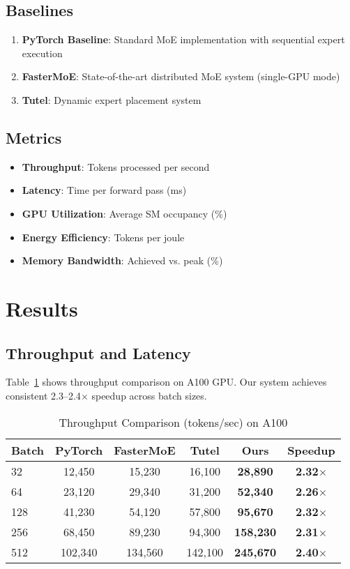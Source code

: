 \documentclass{article}
\begin{document}
\subsection{Baselines}

\begin{enumerate}
    \item \textbf{PyTorch Baseline}: Standard MoE implementation with sequential expert execution
    \item \textbf{FasterMoE}: State-of-the-art distributed MoE system (single-GPU mode)
    \item \textbf{Tutel}: Dynamic expert placement system
\end{enumerate}

\subsection{Metrics}

\begin{itemize}
    \item \textbf{Throughput}: Tokens processed per second
    \item \textbf{Latency}: Time per forward pass (ms)
    \item \textbf{GPU Utilization}: Average SM occupancy (\%)
    \item \textbf{Energy Efficiency}: Tokens per joule
    \item \textbf{Memory Bandwidth}: Achieved vs. peak (\%)
\end{itemize}

\section{Results}

\subsection{Throughput and Latency}

Table~\ref{tab:throughput} shows throughput comparison on A100 GPU. Our system achieves consistent 2.3--2.4$\times$ speedup across batch sizes.

\begin{table}[h]
\centering
\caption{Throughput Comparison (tokens/sec) on A100}
\label{tab:throughput}
\begin{tabular}{lccccc}
\toprule
Batch & PyTorch & FasterMoE & Tutel & \textbf{Ours} & \textbf{Speedup} \\
\midrule
32    & 12,450  & 15,230    & 16,100 & \textbf{28,890}  & \textbf{2.32$\times$} \\
64    & 23,120  & 29,340    & 31,200 & \textbf{52,340}  & \textbf{2.26$\times$} \\
128   & 41,230  & 54,120    & 57,800 & \textbf{95,670}  & \textbf{2.32$\times$} \\
256   & 68,450  & 89,230    & 94,300 & \textbf{158,230} & \textbf{2.31$\times$} \\
512   & 102,340 & 134,560   & 142,100& \textbf{245,670} & \textbf{2.40$\times$} \\
\bottomrule
\end{tabular}
\end{table}
\end{document}

